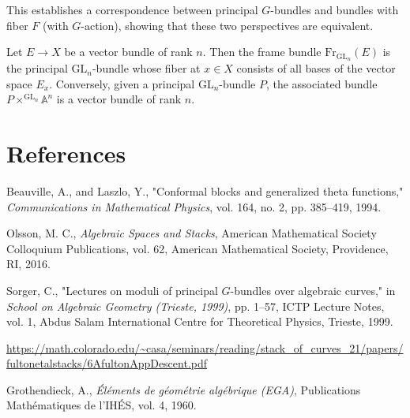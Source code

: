 \documentclass[12pt]{article}
\begin{document}
This establishes a correspondence between principal $G$-bundles and bundles with fiber $F$ (with $G$-action), showing that these two perspectives are equivalent.

\begin{example}
    Let $E \to X$ be a vector bundle of rank $n$. Then the frame bundle $\text{Fr}_{\text{GL}_n}(E)$ is the principal $\text{GL}_n$-bundle whose fiber at $x \in X$ consists of all bases of the vector space $E_x$. Conversely, given a principal $\text{GL}_n$-bundle $P$, the associated bundle $P \times^{\text{GL}_n} \mathbb{A}^n$ is a vector bundle of rank $n$.
\end{example}

\section{References}
\begin{enumerate}
    Beauville, A., and Laszlo, Y.,
    "Conformal blocks and generalized theta functions,"
    \textit{Communications in Mathematical Physics},
    vol. 164, no. 2, pp. 385--419, 1994.

    Olsson, M. C.,
    \textit{Algebraic Spaces and Stacks},
    American Mathematical Society Colloquium Publications, vol. 62,
    American Mathematical Society, Providence, RI, 2016.

    Sorger, C.,
    "Lectures on moduli of principal $G$-bundles over algebraic curves,"
    in \textit{School on Algebraic Geometry (Trieste, 1999)}, pp. 1--57,
    ICTP Lecture Notes, vol. 1, Abdus Salam International Centre for Theoretical Physics, Trieste, 1999.

    \url{https://math.colorado.edu/~casa/seminars/reading/stack_of_curves_21/papers/fultonetalstacks/6AfultonAppDescent.pdf}

    Grothendieck, A.,
    \textit{Éléments de géométrie algébrique (EGA)},
    Publications Mathématiques de l'IHÉS, vol. 4, 1960.

\end{enumerate}
\end{document}

